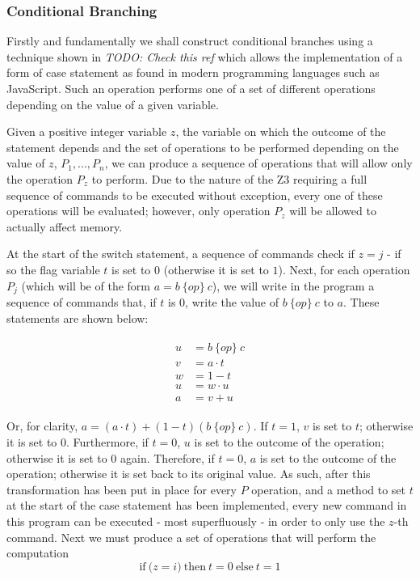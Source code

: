 \documentclass[Master.tex]{subfiles}
\begin{document}
\subsubsection{Conditional Branching}

Firstly and fundamentally we shall construct conditional branches using a technique shown in \cite{ibarra1983intdivision} \textit{TODO: Check this ref} which allows the implementation of a form of case statement as found in modern programming languages such as JavaScript. Such an operation performs one of a set of different operations depending on the value of a given variable.

Given a positive integer variable $z$, the variable on which the outcome of the statement depends and the set of operations to be performed depending on the value of $z$, $P_1, ... , P_n$, we can produce a sequence of operations that will allow only the operation $P_z$ to perform. Due to the nature of the Z3 requiring a full sequence of commands to be executed without exception, every one of these operations will be evaluated; however, only operation $P_z$ will be allowed to actually affect memory.


At the start of the switch statement, a sequence of commands check if $z = j$ - if so the flag variable $t$ is set to $0$ (otherwise it is set to $1$). Next, for each operation $P_j$ (which will be of the form $a = b\ \{op\}\ c$), we will write in the program a sequence of commands that, if $t$ is $0$, write the value of $b\ \{op\}\ c$ to $a$. These statements are shown below:

\begin{gather*}
\begin{aligned}
u &= b\ \{op\}\ c \\
v &= a \cdot t \\
w &= 1 - t \\
u &= w \cdot u \\
a &= v + u
\end{aligned}
\end{gather*}

Or, for clarity, $a = (a \cdot t) + (1 - t)(b\ \{op\}\ c)$. If $t = 1$, $v$ is set to $t$; otherwise it is set to $0$. Furthermore, if $t = 0$, $u$ is set to the outcome of the operation; otherwise it is set to $0$ again. Therefore, if $t = 0$, $a$ is set to the outcome of the operation; otherwise it is set back to its original value. As such, after this transformation has been put in place for every $P$ operation, and a method to set $t$ at the start of the case statement has been implemented, every new command in this program can be executed - most superfluously - in order to only use the $z$-th command. Next we must produce a set of operations that will perform the computation
\begin{equation*}
\mathrm{if\ (}z = i\mathrm{)\ then\ } t = 0 \mathrm{\ else\ } t = 1
\end{equation*}
\end{document}
